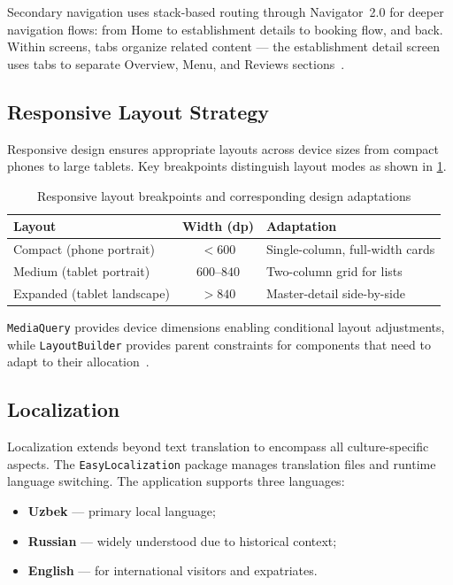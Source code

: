 Secondary navigation uses stack-based routing through Navigator~2.0 for deeper navigation flows: from Home to establishment details to booking flow, and back.
Within screens, tabs organize related content --- the establishment detail screen uses tabs to separate Overview, Menu, and Reviews sections~\cite{wasserman2010}.

\subsection{Responsive Layout Strategy}
\label{subsec:responsive}

Responsive design ensures appropriate layouts across device sizes from compact phones to large tablets.
Key breakpoints distinguish layout modes as shown in \cref{tab:breakpoints}.

\begin{table}[htbp]
\caption{Responsive layout breakpoints and corresponding design adaptations}
\label{tab:breakpoints}
\centering
\small
\begin{tabular}{lcl}
\toprule
\textbf{Layout} & \textbf{Width (dp)} & \textbf{Adaptation} \\
\midrule
Compact (phone portrait)  & $< 600$     & Single-column, full-width cards \\
Medium (tablet portrait)  & $600$--$840$  & Two-column grid for lists \\
Expanded (tablet landscape) & $> 840$   & Master-detail side-by-side \\
\bottomrule
\end{tabular}
\end{table}

\texttt{MediaQuery} provides device dimensions enabling conditional layout adjustments, while \texttt{LayoutBuilder} provides parent constraints for components that need to adapt to their allocation~\cite{flutter_arch2024}.

\subsection{Localization}
\label{subsec:localization}

Localization extends beyond text translation to encompass all culture-specific aspects.
The \texttt{EasyLocalization} package manages translation files and runtime language switching.
The application supports three languages:
\begin{itemize}
  \item \textbf{Uzbek} --- primary local language;
  \item \textbf{Russian} --- widely understood due to historical context;
  \item \textbf{English} --- for international visitors and expatriates.
\end{itemize}

